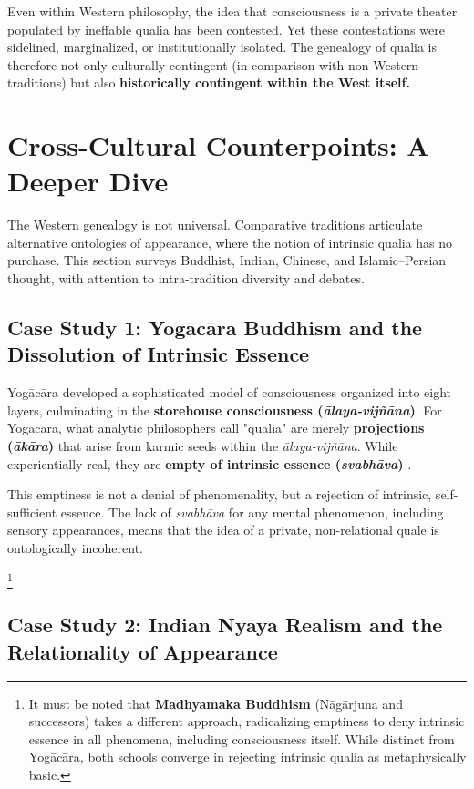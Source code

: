 \documentclass[11pt,a4paper]{article}
\begin{document}
Even within Western philosophy, the idea that consciousness is a private theater populated by ineffable qualia has been contested. Yet these contestations were sidelined, marginalized, or institutionally isolated. The genealogy of qualia is therefore not only culturally contingent (in comparison with non-Western traditions) but also \textbf{historically contingent within the West itself.}

\section{Cross-Cultural Counterpoints: A Deeper Dive}

The Western genealogy is not universal. Comparative traditions articulate alternative ontologies of appearance, where the notion of intrinsic qualia has no purchase. This section surveys Buddhist, Indian, Chinese, and Islamic–Persian thought, with attention to intra-tradition diversity and debates.

\subsection{Case Study 1: Yogācāra Buddhism and the Dissolution of Intrinsic Essence}

Yogācāra developed a sophisticated model of consciousness organized into eight layers, culminating in the \textbf{storehouse consciousness (\emph{ālaya-vijñāna})}. For Yogācāra, what analytic philosophers call "qualia" are merely \textbf{projections (\emph{ākāra})} that arise from karmic seeds within the \emph{ālaya-vijñāna}. While experientially real, they are \textbf{empty of intrinsic essence (\emph{svabhāva})} \cite{lusthaus2002, garfield2015}.

This emptiness is not a denial of phenomenality, but a rejection of intrinsic, self-sufficient essence. The lack of \emph{svabhāva} for any mental phenomenon, including sensory appearances, means that the idea of a private, non-relational quale is ontologically incoherent.

\footnote{It must be noted that \textbf{Madhyamaka Buddhism} (Nāgārjuna and successors) takes a different approach, radicalizing emptiness to deny intrinsic essence in all phenomena, including consciousness itself. While distinct from Yogācāra, both schools converge in rejecting intrinsic qualia as metaphysically basic.}

\subsection{Case Study 2: Indian Nyāya Realism and the Relationality of Appearance}
\end{document}
